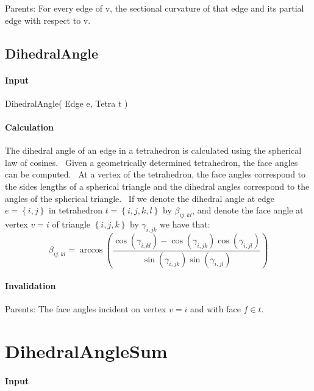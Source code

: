 Parents: For every edge of v, the sectional curvature of that edge and its
partial edge with respect to v.\bigskip

\subsection{DihedralAngle}

\paragraph{Input}

DihedralAngle( Edge e, Tetra t )

\paragraph{Calculation}

The dihedral angle of an edge in a tetrahedron is calculated using the
spherical law of cosines. \ Given a geometrically determined tetrahedron,
the face angles can be computed. \ At a vertex of the tetrahedron, the face
angles correspond to the sides lengths of a spherical triangle and the
dihedral angles correspond to the angles of the spherical triangle. \ If we
denote the dihedral angle at edge $e=\left\{ i,j\right\} $ in tetrahedron $%
t=\left\{ i,j,k,l\right\} $ by $\beta _{ij,kl}$, and denote the face angle
at vertex $v=i$ of triangle $\left\{ i,j,k\right\} $ by $\gamma _{i,jk}$ we
have that:%
\begin{equation*}
\beta _{ij,kl}=\arccos \left( \frac{\cos \left( \gamma _{i,kl}\right) -\cos
\left( \gamma _{i,jk}\right) \cos \left( \gamma _{i,jl}\right) }{\sin \left(
\gamma _{i,jk}\right) \sin \left( \gamma _{i,jl}\right) }\right)
\end{equation*}

\paragraph{Invalidation}

\bigskip Parents: The face angles incident on vertex $v=i$ and with face $%
f\in t$.

\section{DihedralAngleSum}

\paragraph{Input}

